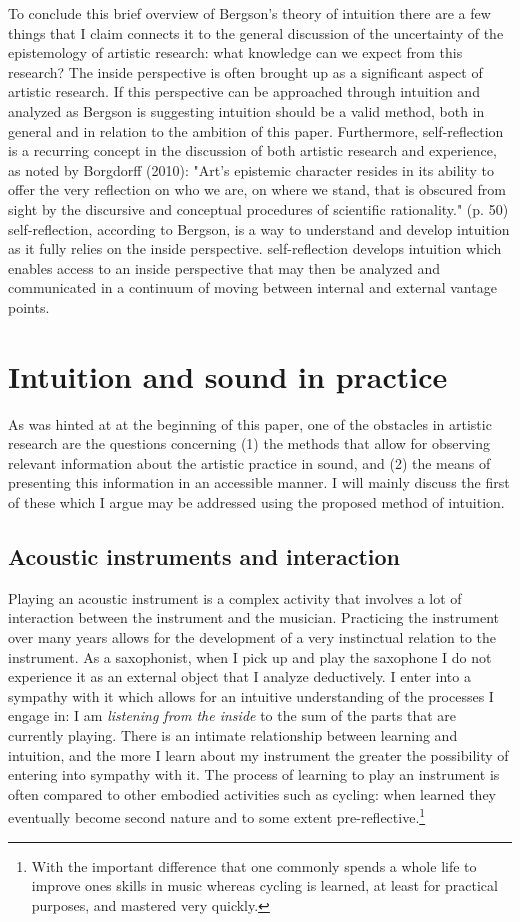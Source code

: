 \documentclass[11pt]{article}
\makeatletter
\newcommand{\cslcitation}[2]
 {\protect\hyper@linkstart{cite}{citeproc_bib_item_#1}#2\hyper@linkend}
\makeatother
\begin{document}
To conclude this brief overview of Bergson's theory of intuition there are a few things that I claim connects it to the general discussion of the uncertainty of the epistemology of artistic research: what knowledge can we expect from this research? The inside perspective is often brought up as a significant aspect of artistic research.
If this perspective can be approached through intuition and analyzed as Bergson is suggesting intuition should be a valid method, both in general and in relation to the ambition of this paper.
Furthermore, self-reflection is a recurring concept in the discussion of both artistic research and experience, as noted by Borgdorff (\cslcitation{5}{2010}): "Art’s epistemic character resides in its ability to offer the very reflection on who we
are, on where we stand, that is obscured from sight by the discursive and conceptual
procedures of scientific rationality." (p. 50)
self-reflection, according to Bergson, is a way to understand and develop intuition as it fully relies on the inside perspective.
self-reflection develops intuition which enables access to an inside perspective that may then be analyzed and communicated in a continuum of moving between internal and external vantage points.
\section*{Intuition and sound in practice}
\label{sec:org375c973}
As was hinted at at the beginning of this paper, one of the obstacles in artistic research are the questions concerning (1) the methods that allow for observing relevant information about the artistic practice in sound, and (2) the means of presenting this information in an accessible manner.
I will mainly discuss the first of these which I argue may be addressed using the proposed method of intuition.
\subsection*{Acoustic instruments and interaction}
\label{sec:org7fe4667}
Playing an acoustic instrument is a complex activity that involves a lot of interaction between the instrument and the musician. Practicing the instrument over many years allows for the development of a very instinctual relation to the instrument.
As a saxophonist, when I pick up and play the saxophone I do not experience it as an external object that I analyze deductively.
I enter into a sympathy with it which allows for an intuitive understanding of the processes I engage in: I am \emph{listening from the inside} to the sum of the parts that are currently playing.
There is an intimate relationship between learning and intuition, and the more I learn about my instrument the greater the possibility of entering into sympathy with it.
The process of learning to play an instrument is often compared to other embodied activities such as cycling: when learned they eventually become second nature and to some extent pre-reflective.\footnote{With the important difference that one commonly spends a whole life to improve ones skills in music whereas cycling is learned, at least for practical purposes, and mastered very quickly.}
\end{document}
